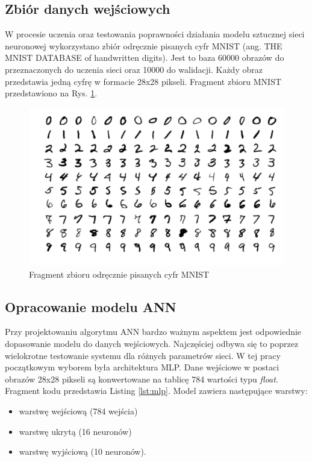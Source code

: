 \subsection{Zbiór danych wejściowych}

W procesie uczenia oraz testowania poprawności działania modelu sztucznej 
sieci neuronowej wykorzystano zbiór odręcznie pisanych cyfr MNIST 
(ang. THE MNIST DATABASE of handwritten digits)\cite{lecun-mnisthandwrittendigit-2010}. Jest to baza 60000 obrazów do 
przeznaczonych do uczenia sieci oraz 10000 do walidacji. Każdy obraz przedstawia jedną cyfrę w formacie 28x28 pikseli. 
Fragment zbioru MNIST przedstawiono na Rys. \ref{mnist-set}.

\begin{figure}
  \centering
  \includegraphics[width=\textwidth]{img/mnist.png}
  \caption{Fragment zbioru odręcznie pisanych cyfr MNIST}
  \label{mnist-set}
\end{figure}

\subsection{Opracowanie modelu ANN}

Przy projektowaniu algorytmu ANN bardzo ważnym aspektem jest odpowiednie dopasowanie modelu do danych wejściowych. 
Najczęściej odbywa się to poprzez wielokrotne testowanie systemu dla różnych parametrów sieci. W tej pracy początkowym 
wyborem była architektura MLP. Dane wejściowe w postaci obrazów 28x28 pikseli są konwertowane na tablicę 784 wartości 
typu \emph{float}. Fragment kodu przedstawia Listing \ref{lst:mlp}. Model zawiera następujące warstwy:
\begin{itemize}
  \item warstwę wejściową (784 wejścia)
  \item warstwę ukrytą (16 neuronów)
  \item warstwę wyjściową (10 neuronów).
\end{itemize}

